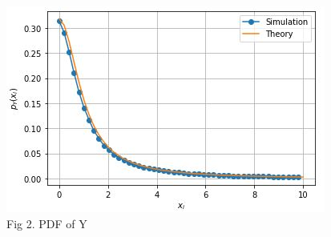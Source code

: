 \documentclass[journal,12pt,twocolumn]{IEEEtran}
\begin{document}
\begin{figure}[ht]
\centering
\includegraphics[width=\columnwidth]{pdf.png}
\caption*{Fig 2. PDF of Y}
\label{fig:fig2}
\end{figure}
\end{document}
